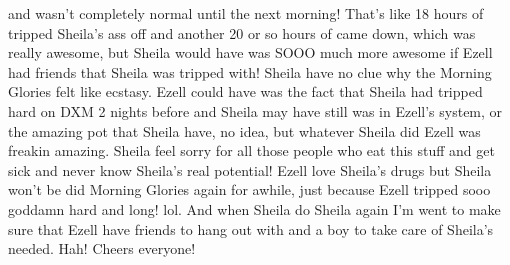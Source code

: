 \documentclass[12pt]{book}
\begin{document}
and wasn't completely normal until the next morning! That's like 18 hours of tripped Sheila's ass off and another 20 or so hours of came down, which was really awesome, but Sheila would have was SOOO much more awesome if Ezell had friends that Sheila was tripped with! Sheila have no clue why the Morning Glories felt like ecstasy. Ezell could have was the fact that Sheila had tripped hard on DXM 2 nights before and Sheila may have still was in Ezell's system, or the amazing pot that Sheila have, no idea, but whatever Sheila did Ezell was freakin amazing. Sheila feel sorry for all those people who eat this stuff and get sick and never know Sheila's real potential! Ezell love Sheila's drugs but Sheila won't be did Morning Glories again for awhile, just because Ezell tripped sooo goddamn hard and long! lol. And when Sheila do Sheila again I'm went to make sure that Ezell have friends to hang out with and a boy to take care of Sheila's needed. Hah! Cheers everyone!
\end{document}
